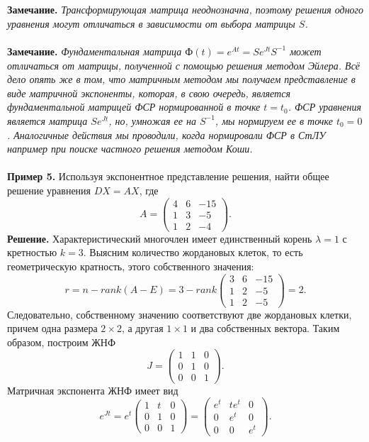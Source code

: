\documentclass[a4paper, 12pt]{article}
\newcommand{\FI}{\text{Ф}}
\begin{document}
\\\\
\textbf{Замечание.} \textit{Трансформирующая матрица неоднозначна, поэтому решения одного уравнения могут отличаться в зависимости от выбора матрицы $S$.}\\\\
\textbf{Замечание.} \textit{Фундаментальная матрица $\FI(t) = e^{At} = Se^{Jt}S^{-1}$ может отличаться от матрицы, полученной с помощью решения методом Эйлера. Всё дело опять же в том, что матричным методом мы получаем представление в виде матричной экспоненты, которая, в свою очередь, является фундаментальной матрицей ФСР нормированной в точке $t = t_0$. ФСР уравнения является матрица $Se^{Jt}$, но, умножая ее на $S^{-1}$, мы нормируем ее в точке $t_0 = 0$. Аналогичные действия мы проводили, когда нормировали ФСР в СтЛУ например при поиске частного решения методом Коши.}\\\\
\textbf{Пример 5.} Используя экспонентное представление решения, найти общее решение уравнения $DX = AX$, где $$A = \begin{pmatrix}
	4 & 6 & -15\\
	1 & 3 & -5\\
	1 & 2 & -4
\end{pmatrix}.$$
\textbf{Решение.} Характеристический многочлен имеет единственный корень $\lambda = 1$ с кретностью $k=3$. Выясним количество жордановых клеток, то есть геометрическую кратность, этого собственного значения:
$$r = n - rank(A - E) = 3 - rank\begin{pmatrix}
	3 & 6 & -15\\
	1 & 2 & -5\\
	1 & 2 & -5
\end{pmatrix} = 2.$$
Следовательно, собственному значению соответствуют две жордановых клетки, причем одна размера $2\times2$, а другая $1\times1$ и два собственных вектора. Таким образом, построим ЖНФ
$$J = \begin{pmatrix}
	1 & 1 & 0\\
	0 & 1 & 0\\
	0 & 0 & 1
\end{pmatrix}.$$ Матричная экспонента ЖНФ имеет вид
$$e^{Jt} = e^t \begin{pmatrix}
	1 & t & 0\\
	0 & 1 & 0\\
	0 & 0 & 1
\end{pmatrix} = \begin{pmatrix}
e^t & te^t & 0\\
0 & e^t & 0\\
0 & 0 & e^t
\end{pmatrix}.$$
\end{document}
